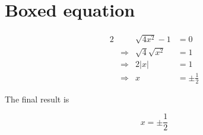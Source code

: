 \documentclass{article}
\begin{document}
\section*{Boxed equation}

\begin{alignat*}{2}
	&& \sqrt{4 x^2} - 1 &= 0 \\
	&\Rightarrow & \sqrt{4} \sqrt{x^2} &= 1 \\
	&\Rightarrow & 2 \left|x\right| &= 1 \\
	&\Rightarrow & x &= \pm \frac{1}{2}
\end{alignat*}

The final result is

\begin{equation}
	\boxed{x = \pm \frac{1}{2}}
\end{equation}
\end{document}
